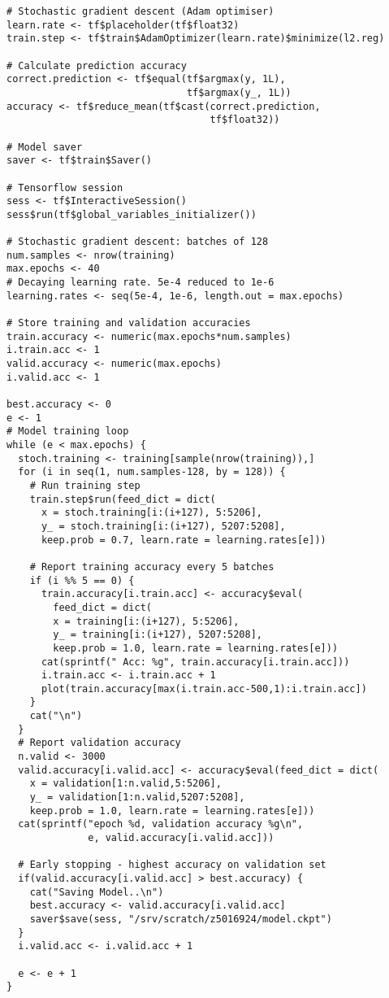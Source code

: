 \begin{appendices}
\begin{verbatim}
# Stochastic gradient descent (Adam optimiser)
learn.rate <- tf$placeholder(tf$float32)
train.step <- tf$train$AdamOptimizer(learn.rate)$minimize(l2.reg)

# Calculate prediction accuracy
correct.prediction <- tf$equal(tf$argmax(y, 1L),
                               tf$argmax(y_, 1L))
accuracy <- tf$reduce_mean(tf$cast(correct.prediction,
                                   tf$float32))

# Model saver
saver <- tf$train$Saver()

# Tensorflow session
sess <- tf$InteractiveSession()
sess$run(tf$global_variables_initializer())

# Stochastic gradient descent: batches of 128
num.samples <- nrow(training)
max.epochs <- 40
# Decaying learning rate. 5e-4 reduced to 1e-6
learning.rates <- seq(5e-4, 1e-6, length.out = max.epochs)

# Store training and validation accuracies
train.accuracy <- numeric(max.epochs*num.samples)
i.train.acc <- 1
valid.accuracy <- numeric(max.epochs)
i.valid.acc <- 1

best.accuracy <- 0
e <- 1
# Model training loop
while (e < max.epochs) {
  stoch.training <- training[sample(nrow(training)),]
  for (i in seq(1, num.samples-128, by = 128)) {
    # Run training step
    train.step$run(feed_dict = dict(
      x = stoch.training[i:(i+127), 5:5206],
      y_ = stoch.training[i:(i+127), 5207:5208],
      keep.prob = 0.7, learn.rate = learning.rates[e]))
    
    # Report training accuracy every 5 batches
    if (i %% 5 == 0) {
      train.accuracy[i.train.acc] <- accuracy$eval(
        feed_dict = dict(
        x = training[i:(i+127), 5:5206],
        y_ = training[i:(i+127), 5207:5208],
        keep.prob = 1.0, learn.rate = learning.rates[e]))
      cat(sprintf(" Acc: %g", train.accuracy[i.train.acc]))
      i.train.acc <- i.train.acc + 1
      plot(train.accuracy[max(i.train.acc-500,1):i.train.acc])
    }
    cat("\n")
  }
  # Report validation accuracy
  n.valid <- 3000
  valid.accuracy[i.valid.acc] <- accuracy$eval(feed_dict = dict(
    x = validation[1:n.valid,5:5206],
    y_ = validation[1:n.valid,5207:5208],
    keep.prob = 1.0, learn.rate = learning.rates[e]))
  cat(sprintf("epoch %d, validation accuracy %g\n",
              e, valid.accuracy[i.valid.acc]))
  
  # Early stopping - highest accuracy on validation set
  if(valid.accuracy[i.valid.acc] > best.accuracy) {
    cat("Saving Model..\n")
    best.accuracy <- valid.accuracy[i.valid.acc]
    saver$save(sess, "/srv/scratch/z5016924/model.ckpt")
  }
  i.valid.acc <- i.valid.acc + 1
  
  e <- e + 1
}
\end{verbatim}

\end{appendices}





%
